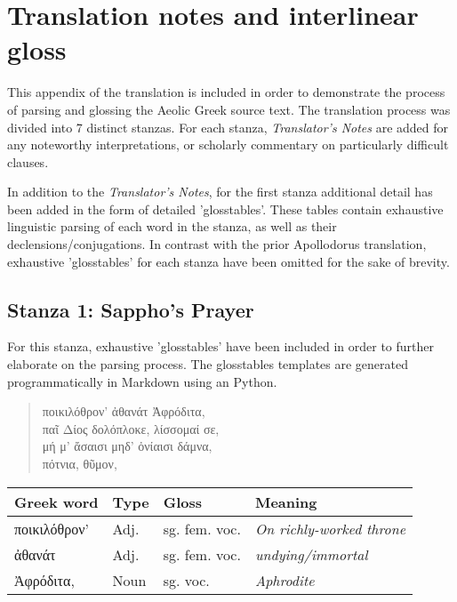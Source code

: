 \section*{Translation notes and interlinear gloss}
This appendix of the translation is included in order to demonstrate the process of parsing and glossing the Aeolic Greek source text. The translation process was divided into 7 distinct stanzas. For each stanza, \emph{Translator's Notes} are added for any noteworthy interpretations, or scholarly commentary on particularly difficult clauses.

In addition to the \emph{Translator's Notes}, for the first stanza additional detail has been added in the form of detailed 'glosstables'. These tables contain exhaustive linguistic parsing of each word in the stanza, as well as their declensions/conjugations. In contrast with the prior Apollodorus translation, exhaustive 'glosstables' for each stanza have been omitted for the sake of brevity.

\subsection*{Stanza 1: Sappho's Prayer}
For this stanza, exhaustive 'glosstables' have been included in order to further elaborate on the parsing process. The glosstables templates are generated programmatically in Markdown using an Python.

\begin{quote}
  ποικιλόθρον’ ἀθανάτ Ἀφρόδιτα,\\
  παῖ Δίος δολόπλοκε, λίσσομαί σε,\\
  μή μ’ ἄσαισι μηδ’ ὀνίαισι δάμνα,\\
  πότνια, θῦμον,\\
\end{quote}

\begin{table}[H]
\begin{tabular}{@{}llll@{}}
\toprule
\textbf{Greek word} & \textbf{Type} & \textbf{Gloss}      & \textbf{Meaning}                 \\ \midrule
ποικιλόθρον'        & Adj.          & sg. fem. voc. & \textit{On richly-worked throne} \\
ἀθανάτ              & Adj.          & sg. fem. voc. & \textit{undying/immortal}        \\
Ἀφρόδιτα,           & Noun          & sg. voc.            & \textit{Aphrodite}               \\ \bottomrule
\end{tabular}
\end{table}

